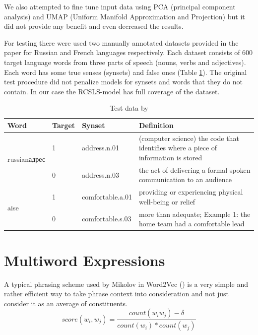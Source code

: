 \documentclass[11pt,a4paper]{article}
\begin{document}
We also attempted to fine tune input data using PCA (principal component analysis) and UMAP (Uniform Manifold Approximation and Projection) \cite{umap} but it did not provide any benefit and even decreased the results.

For testing there were used two manually annotated datasets provided in the paper \cite{Khodak2017} for Russian and French languages respectively. Each dataset consists of 600 target language words from three parts of speech (nouns, verbs and adjectives). Each word has some true senses (synsets) and false ones (Table \ref{wordnet-test-data}). The original test procedure did not penalize models for synsets and words that they do not contain. In our case the RCSLS-model has full coverage of the dataset.

\begin{table}[!htbp]
	\small
	\caption{Test data by \cite{Khodak2017}}
	\label{wordnet-test-data}		
	\centering
	\begin{tabular}{l l l l}
		\hline
		Word & Target &  Synset & Definition \\ \hline
		\multirow{2}{*}{\begin{otherlanguage*}{russian}адрес \end{otherlanguage*}}
		& \multicolumn{1}{l}{1} & \multicolumn{1}{l}{address.n.01} & \multicolumn{1}{l}{(computer science) the code that identifies where a piece of information is stored} \\
		& \multicolumn{1}{l}{0} & \multicolumn{1}{l}{address.n.03} & \multicolumn{1}{l}{the act of delivering a formal spoken communication to an audience} \\
		\hline
		\multirow{2}{*}{aise}
		& \multicolumn{1}{l}{1} & \multicolumn{1}{l}{comfortable.a.01} & \multicolumn{1}{l}{providing or experiencing physical well-being or relief} \\
		& \multicolumn{1}{l}{0} & \multicolumn{1}{l}{comfortable.s.03} & \multicolumn{1}{l}{more than adequate; Example 1: the home team had a comfortable lead} \\
		\hline
	\end{tabular}
	
\end{table}


\section{Multiword Expressions}
A typical phrasing scheme used by Mikolov in Word2Vec (\citeyear{mikolov-representations-2013}) is a very simple	and rather efficient way to take phrase context into consideration and not just consider it as an average of constituents.
$$score(w_i, w_j) = \frac{count(w_iw_j) - \delta}{count(w_i) * count(w_j)}$$
\end{document}
